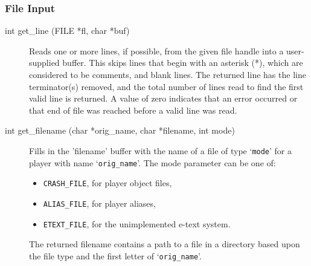\documentclass[11pt]{article}
\begin{document}
\subsubsection{File Input}
\begin{description}
\item[int get\_line (FILE *fl, char *buf)]
Reads one or more lines, if possible, from the given file handle into a user-supplied buffer.  This skips lines that begin with an asterisk (*), which are considered to be comments, and blank lines. The returned line has the line terminator(s) removed, and the total number of lines read to find the first valid line is returned.  A value of zero indicates that an error occurred or that end of file was reached before a valid line was read.
\item[int get\_filename (char *orig\_name, char *filename, int mode)]
Fills in the 'filename' buffer with the name of a file of type `\texttt{mode}' for a player with name `\texttt{orig\_name}'.  The mode parameter can
be one of:
\begin{itemize}
\item \texttt{CRASH\_FILE}, for player object files,
\item \texttt{ALIAS\_FILE}, for player aliases,
\item \texttt{ETEXT\_FILE}, for the unimplemented e-text system.
\end{itemize}
The returned filename contains a path to a file in a directory based upon the file type and the first letter of `\texttt{orig\_name}'.
\end{description}
\end{document}
